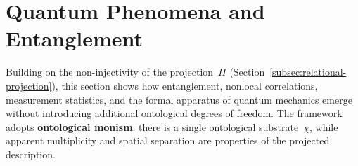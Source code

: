 \clearpage

\section{Quantum Phenomena and Entanglement}
\label{sec:quantum-phenomena-and-entanglement}

Building on the non-injectivity of the projection~$\Pi$
(Section~\ref{subsec:relational-projection}), this section shows how
entanglement, nonlocal correlations, measurement statistics, and the
formal apparatus of quantum mechanics emerge without introducing
additional ontological degrees of freedom.
The framework adopts \textbf{ontological monism}: there is a single
ontological substrate~$\chi$, while apparent multiplicity and spatial
separation are properties of the projected description.














